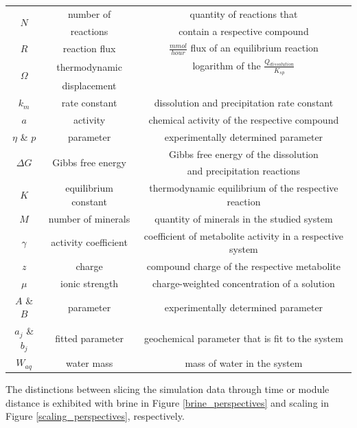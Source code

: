 \begin{supplementary}
\begin{longtable}{c|c|c}
    \multirow{2}{1em}{$N$} & number of & quantity of reactions that \\& reactions & contain a respective compound \\ \midrule
    $R$ & reaction flux & $\frac{mmol}{hour}$ flux of an equilibrium reaction \\ \midrule
    \multirow{2}{1em}{$\Omega$} & thermodynamic & logarithm of the $\frac{Q_{dissolution}}{K_{sp}}$ \\& displacement & \\ \midrule
    $k_m$ & rate constant & dissolution and precipitation rate constant \\ \midrule
    $a$ & activity & chemical activity of the respective compound \\ \midrule
    $\eta$ \& $p$ & parameter & experimentally determined parameter \\ \midrule
    \multirow{2}{2em}{$\Delta G$} & \multirow{2}{5em}{Gibbs free energy} & Gibbs free energy of the dissolution \\& & and precipitation reactions \\ \midrule
    $K$ & equilibrium constant & thermodynamic equilibrium of the respective reaction \\ \midrule
    $M$ & number of minerals & quantity of minerals in the studied system \\ \midrule
    $\gamma$ & activity coefficient & coefficient of metabolite activity in a respective system \\ \midrule
    $z$ & charge & compound charge of the respective metabolite \\ \midrule
    $\mu$ & ionic strength & charge-weighted concentration of a solution \\ \midrule
    $A$ \& $B$ & parameter & experimentally determined parameter \\ \midrule
    $a_j$ \& $b_j$ & fitted parameter & geochemical parameter that is fit to the system \\ \midrule
    $W_{aq}$ & water mass & mass of water in the system \\ \bottomrule
\end{longtable} 

The distinctions between slicing the simulation data through time or module distance is exhibited with brine in Figure \ref{brine_perspectives} and scaling in Figure \ref{scaling_perspectives}, respectively.


\end{supplementary}
